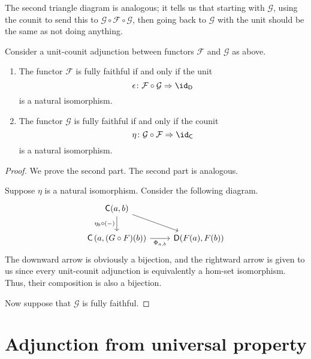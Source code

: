 \documentclass[notes.tex]{subfiles}
\begin{document}
The second triangle diagram is analogous; it tells us that starting with $\mathcal{G}$, using the counit to send this to $\mathcal{G} \circ \mathcal{F} \circ \mathcal{G}$, then going back to $\mathcal{G}$ with the unit should be the same as not doing anything.

\begin{proposition}
  Consider a unit-counit adjunction between functors $\mathcal{F}$ and $\mathcal{G}$ as above.
  \begin{enumerate}
    \item The functor $\mathcal{F}$ is fully faithful if and only if the unit
      \begin{equation*}
        \epsilon\colon \mathcal{F} \circ \mathcal{G} \Rightarrow \id_{\mathsf{D}}
      \end{equation*}
      is a natural isomorphism.

    \item The functor $\mathcal{G}$ is fully faithful if and only if the counit
      \begin{equation*}
        \eta\colon \mathcal{G} \circ \mathcal{F} \Rightarrow \id_{\mathsf{C}}
      \end{equation*}
      is a natural isomorphism.
  \end{enumerate}
\end{proposition}
\begin{proof}
  We prove the second part. The second part is analogous.

  Suppose $\eta$ is a natural isomorphism. Consider the following diagram.
  \begin{equation*}
    \begin{tikzcd}
      \mathsf{C}(a, b)
      \arrow[d, swap, "\eta_{b} \circ (-)"]
      \arrow[rd]
      \\
      \mathsf{C}\left(a, (G \circ F)(b)\right)
      \arrow[r, swap, "\Phi_{a,b}"]
      & \mathsf{D}(F(a), F(b))
    \end{tikzcd}
  \end{equation*}
  The downward arrow is obviously a bijection, and the rightward arrow is given to us since every unit-counit adjunction is equivalently a hom-set isomorphism. Thus, their composition is also a bijection.

  Now suppose that $\mathcal{G}$ is fully faithful.
\end{proof}

\section{Adjunction from universal property}
\label{sec:adjunction_from_universal_property}
\end{document}
